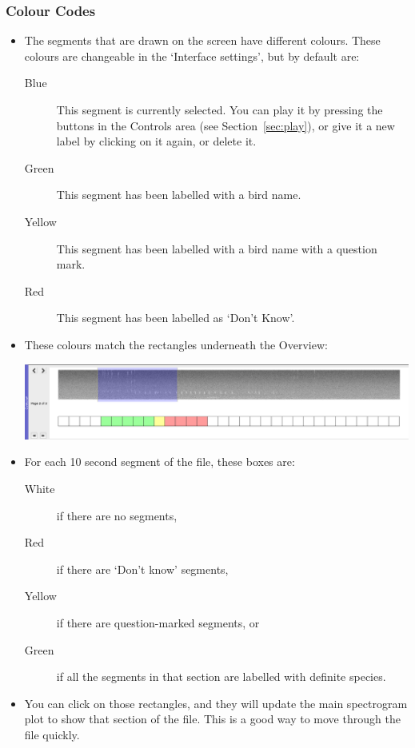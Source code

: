 \documentclass{article}
\begin{document}


\subsubsection*{Colour Codes}

\begin{itemize}

\item The segments that are drawn on the screen have different colours. These colours are changeable in the `Interface settings', but by default are:
	\begin{description} 
	\item[Blue] This segment is currently selected. You can play it by pressing the buttons in the Controls area (see Section~\ref{sec:play}), or give it a new label by clicking on it again, or delete it. 
	\item[Green] This segment has been labelled with a bird name.
	\item[Yellow] This segment has been labelled with a bird name with a question mark.
	\item[Red] This segment has been labelled as `Don't Know'.
	\end{description}

\item These colours match the rectangles underneath the Overview:

\begin{center}
\includegraphics[width=.6\textwidth]{Figs/overview}
\end{center}

\item For each 10 second segment of the file, these boxes are:
	\begin{description} 
 	\item[White] if there are no segments, 
	\item[Red] if there are `Don't know' segments, 
	\item[Yellow] if there are question-marked segments, or 
	\item[Green] if all the segments in that section are labelled with definite species. 
	\end{description}
	
\item You can click on those rectangles, and they will update the main spectrogram plot to show that section of the file. This is a good way to move through the file quickly.
\end{itemize}
\end{document}
